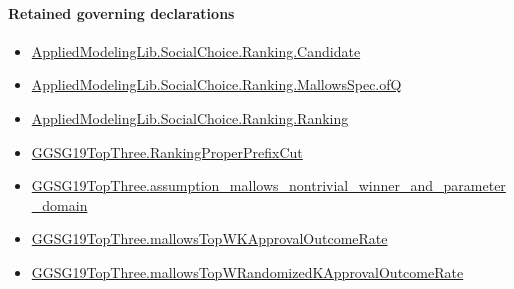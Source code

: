\documentclass[10pt]{article}
\begin{document}
\paragraph{Retained governing declarations}
\begin{itemize}\raggedright
\item \hyperlink{governing-declaration-8c0e6c25845ae78a}{Applied\allowbreak{}Modeling\allowbreak{}Lib.\allowbreak{}Social\allowbreak{}Choice.\allowbreak{}Ranking.\allowbreak{}Candidate}
\item \hyperlink{governing-declaration-f535cdda3f27d5b4}{Applied\allowbreak{}Modeling\allowbreak{}Lib.\allowbreak{}Social\allowbreak{}Choice.\allowbreak{}Ranking.\allowbreak{}Mallows\allowbreak{}Spec.\allowbreak{}of\allowbreak{}Q}
\item \hyperlink{governing-declaration-5cde54446d1ae021}{Applied\allowbreak{}Modeling\allowbreak{}Lib.\allowbreak{}Social\allowbreak{}Choice.\allowbreak{}Ranking.\allowbreak{}Ranking}
\item \hyperlink{governing-declaration-22eb6cc53fca60ee}{GGSG19\allowbreak{}Top\allowbreak{}Three.\allowbreak{}Ranking\allowbreak{}Proper\allowbreak{}Prefix\allowbreak{}Cut}
\item \hyperlink{paper-prerequisite-295f37487ff2fcbb}{GGSG19\allowbreak{}Top\allowbreak{}Three.\allowbreak{}assumption\_\allowbreak{}mallows\_\allowbreak{}nontrivial\_\allowbreak{}winner\_\allowbreak{}and\_\allowbreak{}parameter\_\allowbreak{}domain}
\item \hyperlink{governing-declaration-9477f8aa848ebd61}{GGSG19\allowbreak{}Top\allowbreak{}Three.\allowbreak{}mallows\allowbreak{}Top\allowbreak{}WK\allowbreak{}Approval\allowbreak{}Outcome\allowbreak{}Rate}
\item \hyperlink{governing-declaration-c58da726637440be}{GGSG19\allowbreak{}Top\allowbreak{}Three.\allowbreak{}mallows\allowbreak{}Top\allowbreak{}W\allowbreak{}Randomized\allowbreak{}K\allowbreak{}Approval\allowbreak{}Outcome\allowbreak{}Rate}
\end{itemize}
\end{document}

